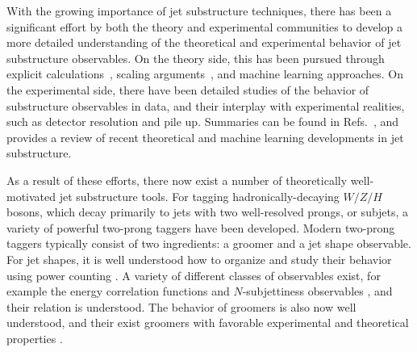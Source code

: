 \documentclass[11pt,letterpaper]{article}
\DeclareRobustCommand{\Refs}[1]{Refs.~\cite{#1}}
\begin{document}
With the growing importance of jet substructure techniques, there has been a significant effort by both the theory and experimental communities to develop a more detailed understanding of the theoretical and experimental behavior of jet substructure observables.
%
On the theory side, this has been pursued through explicit calculations~\cite{Feige:2012vc,Field:2012rw,Dasgupta:2013ihk,Dasgupta:2013via,Larkoski:2014pca,Dasgupta:2015yua,Seymour:1997kj,Li:2011hy,Larkoski:2012eh,Jankowiak:2012na,Chien:2014nsa,Chien:2014zna,Isaacson:2015fra,Krohn:2012fg,Waalewijn:2012sv,Larkoski:2014tva,Procura:2014cba,Bertolini:2015pka,Bhattacherjee:2015psa,Larkoski:2015kga,Dasgupta:2015lxh,Frye:2016okc,Frye:2016aiz,Kang:2016ehg,Hornig:2016ahz,Marzani:2017mva,Marzani:2017kqd,Hoang:2017kmk,Larkoski:2017cqq,Larkoski:2017iuy}, scaling arguments~\cite{Walsh:2011fz,Larkoski:2014gra,Larkoski:2014zma}, and machine learning \cite{Cogan:2014oua,deOliveira:2015xxd,Almeida:2015jua,Baldi:2016fql,Guest:2016iqz,Conway:2016caq,Barnard:2016qma} approaches.
%
On the experimental side, there have been detailed studies of the behavior of substructure observables in data, and their interplay with experimental realities, such as detector resolution and pile up.
%
Summaries can be found in \Refs{Abdesselam:2010pt,Altheimer:2012mn,Altheimer:2013yza,Adams:2015hiv}, and \cite{Larkoski:2017jix} provides a review of recent theoretical and machine learning developments in jet substructure. 

As a result of these efforts, there now exist a number of theoretically well-motivated jet substructure tools.
%
For tagging hadronically-decaying $W/Z/H$ bosons, which decay primarily to jets with two well-resolved prongs, or subjets, a variety of powerful two-prong taggers have been developed.
%
Modern two-prong taggers typically consist of two ingredients: a groomer and a jet shape observable.
%
For jet shapes, it is well understood how to organize and study their
behavior using power counting \cite{Larkoski:2014gra}.
%
A variety of
different classes of observables exist, for example the energy
correlation functions \cite{Larkoski:2013eya,Moult:2016cvt,Komiske:2017aww} and $N$-subjettiness
observables \cite{Thaler:2010tr,Thaler:2011gf}, and their relation is
understood.
%
The behavior of groomers is also now well understood, and
their exist groomers with favorable experimental and theoretical properties
\cite{Dasgupta:2013ihk,Larkoski:2014wba}.
\end{document}
